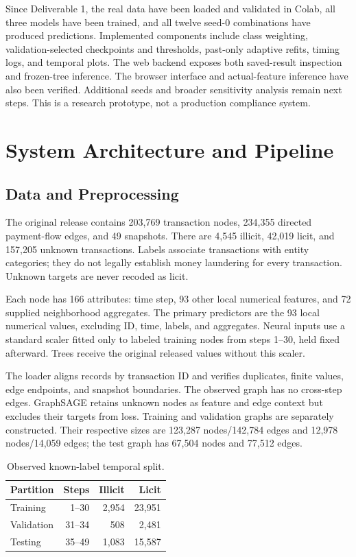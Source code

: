 \documentclass[10pt,twocolumn,letterpaper]{article}
\begin{document}
Since Deliverable 1, the real data have been loaded and validated in Colab, all three models have been trained, and all twelve seed-0 combinations have produced predictions. Implemented components include class weighting, validation-selected checkpoints and thresholds, past-only adaptive refits, timing logs, and temporal plots. The web backend exposes both saved-result inspection and frozen-tree inference. The browser interface and actual-feature inference have also been verified. Additional seeds and broader sensitivity analysis remain next steps. This is a research prototype, not a production compliance system.

\section{System Architecture and Pipeline}
\subsection{Data and Preprocessing}
The original release \cite{dataset} contains 203,769 transaction nodes, 234,355 directed payment-flow edges, and 49 snapshots. There are 4,545 illicit, 42,019 licit, and 157,205 unknown transactions. Labels associate transactions with entity categories; they do not legally establish money laundering for every transaction. Unknown targets are never recoded as licit.

Each node has 166 attributes: time step, 93 other local numerical features, and 72 supplied neighborhood aggregates. The primary predictors are the 93 local numerical values, excluding ID, time, labels, and aggregates. Neural inputs use a standard scaler fitted only to labeled training nodes from steps 1--30, held fixed afterward. Trees receive the original released values without this scaler.

The loader aligns records by transaction ID and verifies duplicates, finite values, edge endpoints, and snapshot boundaries. The observed graph has no cross-step edges. GraphSAGE retains unknown nodes as feature and edge context but excludes their targets from loss. Training and validation graphs are separately constructed. Their respective sizes are 123,287 nodes/142,784 edges and 12,978 nodes/14,059 edges; the test graph has 67,504 nodes and 77,512 edges.

\begin{table}[t]\caption{Observed known-label temporal split.}\centering\small
\begin{tabular}{lrrr}\toprule
Partition & Steps & Illicit & Licit\\\midrule
Training & 1--30 & 2,954 & 23,951\\
Validation & 31--34 & 508 & 2,481\\
Testing & 35--49 & 1,083 & 15,587\\\bottomrule
\end{tabular}\label{tab:split}\end{table}
\end{document}
